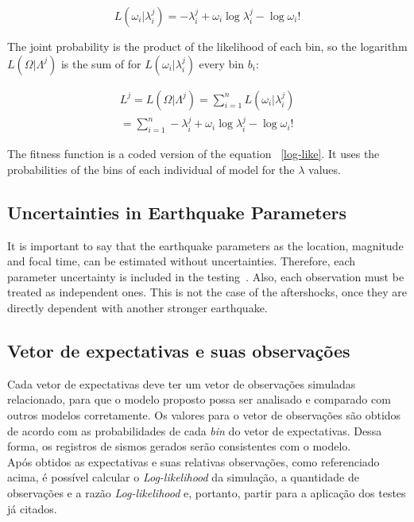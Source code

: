\begin{equation}
	L(\omega_i|\lambda_i^j) = -\lambda_i^j + \omega_i\log\lambda_i^j - \log\omega_i!
\end{equation}

The joint probability is the product of the likelihood of each bin, so
the logarithm $L(\Omega|\Lambda^j)$ is the sum of for
$L(\omega_i|\lambda_i^j)$ every bin $b_i$:

\begin{equation}\label{log-like}
\begin{split}
	L^j = L(\Omega|\Lambda^j) = \sum_{i=1}^{n}L(\omega_i|\lambda_i^j)  \\
	= \sum_{i=1}^{n} -\lambda_i^j + \omega_i\log\lambda_i^j - \log\omega_i!  
\end{split}
\end{equation}

The fitness function is a coded version of the equation
~\ref{log-like}. It uses the probabilities of the bins of each
individual of model for the $\lambda$ values.
				
\subsection{Uncertainties in Earthquake Parameters}
It is important to say that the earthquake parameters as the location, magnitude and focal time, can be estimated without uncertainties. Therefore, each parameter uncertainty is included in the testing~\cite{schorlemmer2007earthquake}. Also, each observation must be treated as independent ones. This is not the case of the aftershocks, once they are directly dependent with another stronger earthquake. \\


\subsection{Vetor de expectativas e suas observações}
Cada vetor de expectativas deve ter um vetor de observações simuladas relacionado, para que o modelo proposto possa ser analisado e comparado com outros modelos corretamente. Os valores para o vetor de observações são obtidos de acordo com as probabilidades de cada {\it bin} do vetor de expectativas. Dessa forma, os registros de sismos gerados serão consistentes com o modelo.\\

Após obtidos as expectativas e suas relativas observações, como referenciado acima, é possível calcular o {\it Log-likelihood} da simulação, a quantidade de observações e a razão {\it Log-likelihood} e, portanto,  partir para a aplicação dos testes já citados.


